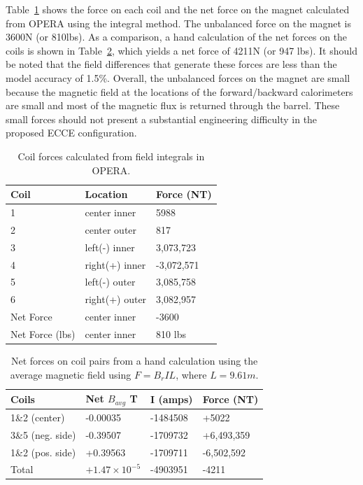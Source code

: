Table~\ref{tab:opera_forces} shows the force on each coil and the net force on the magnet calculated from OPERA using the integral method.  The unbalanced force on the magnet is 3600N (or 810lbs).  As a comparison, a hand calculation of the net forces on the coils is shown in Table~\ref{tab:hand_forces}, which yields a net force of 4211N (or 947 lbs).  It should be noted that the field differences that generate these forces are less than the model accuracy of 1.5\%. Overall, the unbalanced forces on the magnet are small because the magnetic field at the locations of the forward/backward calorimeters are small and most of the magnetic flux is returned through the barrel.  These small forces should not present a substantial engineering difficulty in the proposed ECCE configuration. 

\begin{table}
\centering
\begin{tabular}{lll}
\hline
Coil & Location & Force (NT) \\
\hline
1 & center inner & 5988 \\
2 & center outer & 817 \\
3 & left(-) inner & 3,073,723 \\
4 & right(+) inner & -3,072,571 \\
5 & left(-) outer & 3,085,758 \\
6 & right(+) outer & 3,082,957 \\
Net Force & center inner & -3600 \\
Net Force (lbs) & center inner & 810 lbs \\
\hline
\end{tabular}
\caption{Coil forces calculated from field integrals in OPERA.}
\label{tab:opera_forces}
\end{table}

\begin{table}
\centering
\begin{tabular}{llll}
\hline
Coils & Net $B_{avg}$ T & I (amps) & Force (NT) \\
\hline
1\&2 (center) & -0.00035 & -1484508 & +5022 \\
3\&5 (neg. side) & -0.39507 & -1709732 & +6,493,359 \\
1\&2 (pos. side) & +0.39563 & -1709711 & -6,502,592 \\
Total & $+1.47\times10^{-5}$ & -4903951 & -4211 \\
\hline
\end{tabular}
\caption{Net forces on coil pairs from a hand calculation using the average magnetic field using $F=B_{r}IL$, where $L=9.61m$.}
\label{tab:hand_forces}
\end{table}
